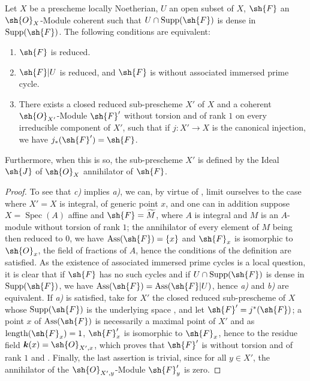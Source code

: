 \begin{proposition}[3.2.3]
\label{IV.3.2.3}
Let $X$ be a prescheme locally Noetherian, $U$ an open subset of $X$, $\sh{F}$ an $\sh{O}_X$-Module coherent such that $U\cap\operatorname{Supp}(\sh{F})$ is dense in $\operatorname{Supp}(\sh{F})$.
The following conditions are equivalent:
\begin{enumerate}[label=\emph{\alph*)}]
  \item $\sh{F}$ is reduced.
  \item $\sh{F}|U$ is reduced, and $\sh{F}$ is without associated immersed prime cycle.
  \item There exists a closed reduced sub-prescheme $X'$ of $X$ and a coherent $\sh{O}_{X'}$-Module $\sh{F}'$ without torsion and of rank $1$ on every irreducible component of $X'$, such that if $j:X'\to X$ is the canonical injection, we have $j_*(\sh{F}')=\sh{F}$.
\end{enumerate}
Furthermore, when this is so, the sub-prescheme $X'$ is defined by the Ideal $\sh{J}$ of $\sh{O}_X$ annihilator of $\sh{F}$.
\end{proposition}

\begin{proof}
To see that \emph{c)} implies \emph{a)}, we can, by virtue of , limit ourselves to the case where $X'=X$ is integral, of generic point $x$, and one can in addition suppose $X=\operatorname{Spec}(A)$ affine and $\sh{F}=\widetilde{M}$, where $A$ is integral and $M$ is an $A$-module without torsion of rank $1$; the annihilator of every element of $M$ being then reduced to $0$, we have $\operatorname{Ass}(\sh{F})=\{x\}$ and $\sh{F}_x$ is isomorphic to $\sh{O}_x$, the field of fractions of $A$, hence the conditions of the definition  are satisfied.
As the existence of associated immersed prime cycles is a local question, it is clear that if $\sh{F}$ has no such cycles and if $U\cap\operatorname{Supp}(\sh{F})$ is dense in $\operatorname{Supp}(\sh{F})$, we have $\operatorname{Ass}(\sh{F})=\operatorname{Ass}(\sh{F}|U)$, hence \emph{a)} and \emph{b)} are equivalent.
If \emph{a)} is satisfied, take for $X'$ the closed reduced sub-prescheme of $X$ whose $\operatorname{Supp}(\sh{F})$ is the underlying space , and let $\sh{F}'=j^*(\sh{F})$; a point $x$ of $\operatorname{Ass}(\sh{F})$ is necessarily a maximal point of $X'$ and as $\operatorname{length}(\sh{F}_x)=1$, $\sh{F}'_x$ is isomorphic to $\sh{F}_x$, hence to the residue field $\boldsymbol{k}(x)=\sh{O}_{X',x}$, which proves that $\sh{F}'$ is without torsion and of rank $1$  and .
Finally, the last assertion is trivial, since for all $y\in X'$, the annihilator of the $\sh{O}_{X',y}$-Module $\sh{F}'_y$ is zero.
\end{proof}

